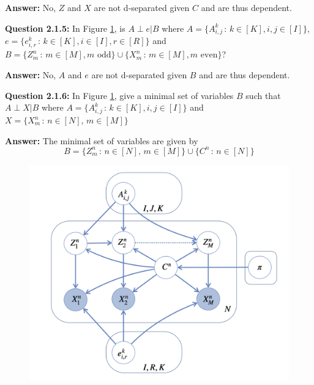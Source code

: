 \textbf{Answer:} No, $Z$ and $X$ are not d-separated given $C$ and are thus dependent.
\\


\begin{tcolorbox}
\textbf{Question 2.1.5:} In Figure \ref{figure2}, is $A \perp e | B$ where $A = \{ A^k_{i,j} \, : \, k \in [K], i,j \in [I] \} $, $e = \{e^k_{i,r} \, : \, k \in [K], i \in [I], r \in [R] \}$ and $B = \{ Z_m^n \, : \, m \in [M], m \text{ odd} \} \cup \{ X_m^n \, : \, m \in [M], m \text{ even} \}$?
\end{tcolorbox}

\textbf{Answer:} No, $A$ and $e$ are not d-separated given $B$ and are thus dependent.
\\


\begin{tcolorbox}
\textbf{Question 2.1.6:} In Figure \ref{figure2}, give a minimal set of variables $B$ such that $A \perp X | B$ where $A = \{ A^k_{i,j} \, : \, k \in [K], i,j \in [I] \} $ and $X = \{ X_m^n \, : \, n \in [N], \, m \in [M] \}$
\end{tcolorbox}

\textbf{Answer:} The minimal set of variables are given by $$B = \{ Z_m^n \, : \, n \in [N], \, m \in [M] \} \cup \{ C^n \, : \, n \in [N] \} $$

\begin{figure}[H]
  \centering
  \includegraphics[width=0.6\linewidth]{Q1_fig_2.png}
  \caption{}
  \label{figure2}
\end{figure}
